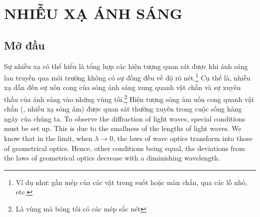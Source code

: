 


\chapter[NHIỄU XẠ ÁNH SÁNG]{NHIỄU XẠ ÁNH SÁNG}\label{chap:18}
\section{Mở đầu}\label{sec:18_1}
Sự nhiễu xạ có thể hiểu là tổng hợp các hiện tượng quan sát được khi ánh sáng lan truyền qua môi trường không có sự đồng đều về độ rõ nét.\footnote{Ví dụ như: gần mép của các vật trong suốt hoặc màn chắn, qua các lỗ nhỏ, etc.}
Cụ thể là, nhiễu xạ dẫn đến sự uốn cong của sóng ánh sáng xung quanh vật chắn và sự xuyên thấu của ánh sáng vào những vùng tối.\footnote{Là vùng mà bóng tối có các mép sắc nét}
Hiện tượng sóng âm uốn cong quanh vật chắn (\ie, nhiễu xạ sóng âm) được quan sát thường xuyên trong cuộc sống hàng ngày của chúng ta.
To observe the diffraction of light waves, special conditions must be set up.
This is due to the smallness of the lengths of light waves.
We know that in the limit, when $\lambda\to 0$, the laws of wave optics transform into those of geometrical optics.
Hence, other conditions being equal, the deviations from the laws of geometrical optics decrease with a diminishing wavelength.

